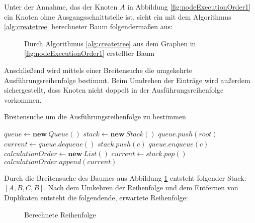 Unter der Annahme, das der Knoten $A$ in Abbildung \ref{fig:nodeExecutionOrder1} ein Knoten ohne Ausgangsschnittstelle ist, sieht ein mit dem Algorithmus \ref{alg:createtree} berechneter Baum folgendermaßen aus:

\begin{figure}[H]
    \centering
    \caption{Durch Algorithmus \ref{alg:createtree} aus dem Graphen in \ref{fig:nodeExecutionOrder1} erstellter Baum}
    \label{fig:nodeExecutionOrder2}
\end{figure}

Anschließend wird mittels einer Breitensuche die umgekehrte Ausführungsreihenfolge bestimmt. Beim Umdrehen der Einträge wird außerdem sichergestellt, dass Knoten nicht doppelt in der Ausführungsreihenfolge vorkommen.

\begin{algorithm}[H]
    \caption{Breitensuche um die Ausführungsreihenfolge zu bestimmen}
    \begin{algorithmic}[1]
        \State $queue \gets \textbf{new} \ Queue()$
        \State $stack \gets \textbf{new} \ Stack()$
        \State $queue.push(root)$
            \State $current \gets queue.dequeue()$
                \State $stack.push(c)$
                \State $queue.enqueue(c)$
            \EndFor
        \EndWhile
        \State $calculationOrder \gets \textbf{new} \ List()$
            \State $current \gets stack.pop()$
                \State $calculationOrder.append(current)$
            \EndIf
        \EndWhile
    \end{algorithmic}
\end{algorithm}

Durch die Breitensuche des Baumes aus Abbildung \ref{fig:nodeExecutionOrder2} entsteht folgender Stack: $[A, B, C, B]$. Nach dem Umkehren der Reihenfolge und dem Entfernen von Duplikaten entsteht die folgendende, erwartete Reihenfolge:
\begin{figure}[H]
    \centering
    \caption{Berechnete Reihenfolge}
    \label{fig:nodeExecutionOrder3}
\end{figure}

